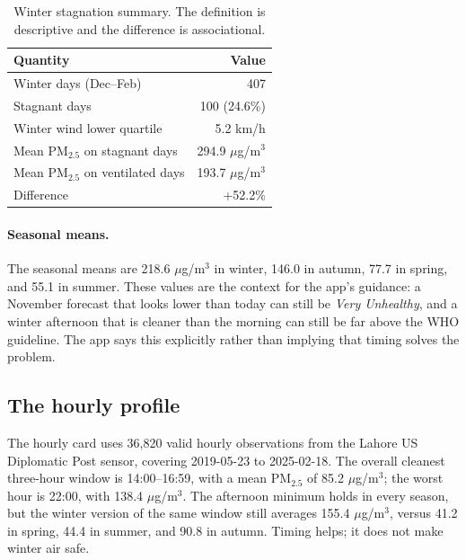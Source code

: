 \begin{table}[htbp]
\centering
\small
\begin{tabular}{@{}lr@{}}
\toprule
\textbf{Quantity} & \textbf{Value} \\
\midrule
Winter days (Dec--Feb) & 407 \\
Stagnant days & 100 (24.6\%) \\
Winter wind lower quartile & 5.2 km/h \\
Mean PM$_{2.5}$ on stagnant days & 294.9 $\mu$g/m$^3$ \\
Mean PM$_{2.5}$ on ventilated days & 193.7 $\mu$g/m$^3$ \\
Difference & +52.2\% \\
\bottomrule
\end{tabular}
\caption{Winter stagnation summary. The definition is descriptive and the
difference is associational.}
\label{tab:stagnation}
\end{table}

\paragraph{Seasonal means.} The seasonal means are 218.6 $\mu$g/m$^3$ in winter,
146.0 in autumn, 77.7 in spring, and 55.1 in summer. These values are the
context for the app's guidance: a November forecast that looks lower than today
can still be \emph{Very Unhealthy}, and a winter afternoon that is cleaner than
the morning can still be far above the WHO guideline. The app says this
explicitly rather than implying that timing solves the problem.

\subsection{The hourly profile}
\label{sec:d3-hourly}

The hourly card uses 36,820 valid hourly observations from the Lahore US
Diplomatic Post sensor, covering 2019-05-23 to 2025-02-18. The overall cleanest
three-hour window is 14:00--16:59, with a mean PM$_{2.5}$ of 85.2
$\mu$g/m$^3$; the worst hour is 22:00, with 138.4 $\mu$g/m$^3$. The afternoon
minimum holds in every season, but the winter version of the same window still
averages 155.4 $\mu$g/m$^3$, versus 41.2 in spring, 44.4 in summer, and 90.8 in
autumn. Timing helps; it does not make winter air safe.

